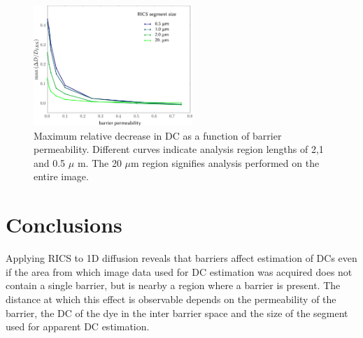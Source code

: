 \begin{figure}%
  \centering
    \includegraphics[width=6cm]{figures/max_5b.pdf}
    \caption[Maximum relative decrease in \acs{DC}]{Maximum relative
    decrease in \acs{DC} as a function of barrier permeability. Different
    curves indicate analysis region lengths of 2,1 and 0.5 $\mu$ m. The
    20 $\mu$m region signifies analysis performed on the entire image.}
    \label{fig:max_5}
\end{figure}
\section{Conclusions}

Applying \ac{RICS} to 1D diffusion reveals that barriers affect
estimation of \acp{DC} even if the area from which image data used
for \ac{DC} estimation was acquired does not contain a single barrier, 
but is nearby a region where a barrier is present. The distance at which this effect is observable depends on the permeability of the barrier, the \ac{DC} of the dye in the inter barrier space and the size of the segment used for apparent \ac{DC} estimation. 
